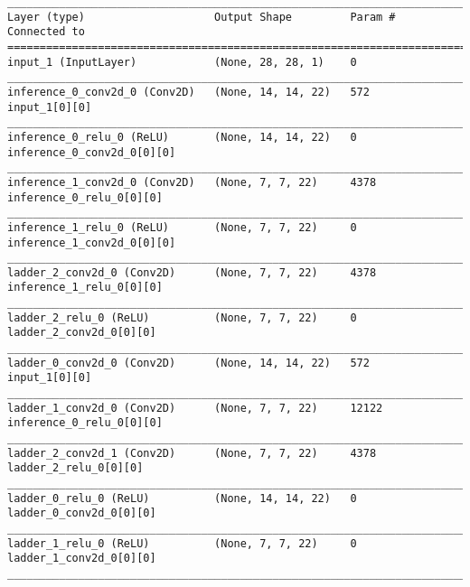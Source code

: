 \begin{lstlisting}[caption={\textsc{Mnist}-\ac{VLAE}-factor-3 Encoder},captionpos=b,basicstyle=\tiny, label={lst:sparsity-vlae-encoder-28-fm3}]
__________________________________________________________________________________________________
Layer (type)                    Output Shape         Param #     Connected to
==================================================================================================
input_1 (InputLayer)            (None, 28, 28, 1)    0
__________________________________________________________________________________________________
inference_0_conv2d_0 (Conv2D)   (None, 14, 14, 22)   572         input_1[0][0]
__________________________________________________________________________________________________
inference_0_relu_0 (ReLU)       (None, 14, 14, 22)   0           inference_0_conv2d_0[0][0]
__________________________________________________________________________________________________
inference_1_conv2d_0 (Conv2D)   (None, 7, 7, 22)     4378        inference_0_relu_0[0][0]
__________________________________________________________________________________________________
inference_1_relu_0 (ReLU)       (None, 7, 7, 22)     0           inference_1_conv2d_0[0][0]
__________________________________________________________________________________________________
ladder_2_conv2d_0 (Conv2D)      (None, 7, 7, 22)     4378        inference_1_relu_0[0][0]
__________________________________________________________________________________________________
ladder_2_relu_0 (ReLU)          (None, 7, 7, 22)     0           ladder_2_conv2d_0[0][0]
__________________________________________________________________________________________________
ladder_0_conv2d_0 (Conv2D)      (None, 14, 14, 22)   572         input_1[0][0]
__________________________________________________________________________________________________
ladder_1_conv2d_0 (Conv2D)      (None, 7, 7, 22)     12122       inference_0_relu_0[0][0]
__________________________________________________________________________________________________
ladder_2_conv2d_1 (Conv2D)      (None, 7, 7, 22)     4378        ladder_2_relu_0[0][0]
__________________________________________________________________________________________________
ladder_0_relu_0 (ReLU)          (None, 14, 14, 22)   0           ladder_0_conv2d_0[0][0]
__________________________________________________________________________________________________
ladder_1_relu_0 (ReLU)          (None, 7, 7, 22)     0           ladder_1_conv2d_0[0][0]
__________________________________________________________________________________________________

\end{lstlisting}
